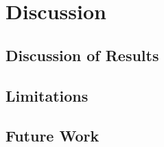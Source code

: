 

\chapter{Discussion}
\label{chap:discussion} 


\section{Discussion of Results}
\label{sec:discussion-of-results}


\section{Limitations}
\label{sec:limitations}


\section{Future Work}
\label{sec:future-work}

